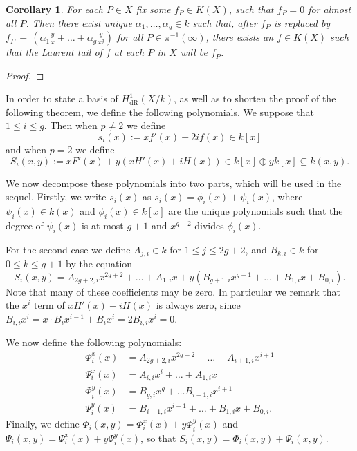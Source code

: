 \documentclass[draft, 11pt]{article} %
\theoremstyle{plain}
\newtheorem{cor}[defn]{Corollary}
\theoremstyle{remark}
\newcommand{\derhamhone}{H_{\text {dR}}^1(X/k)}
\begin{document}
\begin{cor}
For each $P \in X$ fix some $f_P \in K(X)$, such that $f_P = 0$ for almost all $P$.
Then there exist unique $\alpha_1, \ldots , \alpha_g \in k$ such that, after $f_P$ is replaced by $f_P~-~\left(\alpha_1 \frac{y}{x} + \ldots + \alpha_g \frac{y}{x^g} \right)$ for all $P \in \pi^{-1}(\infty)$, there exists an $f \in K(X)$ such that the Laurent tail of $f$ at each $P$ in $X$ will be $f_P$.
\end{cor}
\begin{proof}

\end{proof}


In order to state a basis of $\derhamhone$, as well as to shorten the proof of the following theorem, we define the following polynomials. 
We suppose that $1 \leq i \leq g$.
Then when $p\neq 2$ we define
\[
s_i(x) := xf'(x) - 2if(x) \in k[x]
\]
and when $p = 2$ we define
\begin{equation}\label{capitals}
S_i(x,y) := xF'(x) + y(xH'(x) + iH(x))\in k[x]\oplus yk[x] \subseteq k(x,y).
\end{equation}

We now decompose these polynomials into two parts, which will be used in the sequel.
Firstly, we write $s_i(x)$ as $s_i(x) = \phi_i(x) + \psi_i(x)$, where $\psi_i(x)\in k(x)$ and $\phi_i(x) \in k[x]$ are the unique polynomials such that the degree of $\psi_i (x)$ is at most $g+1$ and $x^{g+2}$ divides $\phi_i(x)$.

For the second case we define $A_{j,i} \in k$ for $1 \leq j \leq 2g+2$, and $B_{k,i} \in k$ for $0\leq k \leq g+1$ by the equation
\[
S_i(x,y) = A_{2g+2,i}x^{2g+2} + \ldots + A_{1,i} x + y(B_{g+1,i} x^{g+1} + \ldots + B_{1,i} x + B_{0,i}).
\]
Note that many of these coefficients may be zero.
In particular we remark that the $x^i$ term of $xH'(x) + iH(x)$ is always zero, since $B_{i,i}x^i = x \cdot B_ix^{i-1} + B_i x^i = 2B_{i,i}x^i = 0$.


We now define the following polynomials:
\begin{equation}\label{Split}
\begin{split}
\Phi_i^x(x) & =  A_{2g+2, i}x^{2g+2} + \ldots + A_{i+1, i}x^{i+1} \\
\Psi_i^x(x) & =  A_{i,i}x^i + \ldots + A_{1,i}x \\
\Phi_i^y(x) & =  B_{g,i}x^g + \ldots B_{i+1,i}x^{i+1} \\
\Psi_i^y(x) & =  B_{i-1,i}x^{i-1} + \ldots + B_{1,i}x + B_{0,i}.
\end{split}
\end{equation}
Finally, we define $\Phi_i(x,y) = \Phi_i^x(x) + y \Phi^y_i(x)$ and $\Psi_i(x,y) = \Psi_i^x(x) + y \Psi_i^y(x)$, so that $S_i(x,y) = \Phi_i(x,y) + \Psi_i(x,y)$.
\end{document}

